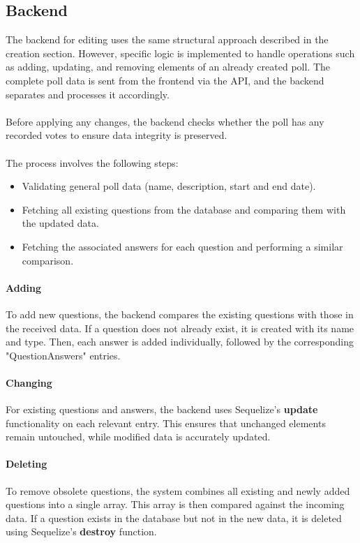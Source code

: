 \documentclass[a4paper,12pt]{report}
\begin{document}
\subsection{Backend}
The backend for editing uses the same structural approach described in the creation section. However, specific logic is implemented to handle operations such as adding, updating, and removing elements of an already created poll. The complete poll data is sent from the frontend via the API, and the backend separates and processes it accordingly. \\ \\
Before applying any changes, the backend checks whether the poll has any recorded votes to ensure data integrity is preserved. \\ \\
The process involves the following steps:
\begin{itemize}
	\item Validating general poll data (name, description, start and end date).
	\item Fetching all existing questions from the database and comparing them with the updated data.
	\item Fetching the associated answers for each question and performing a similar comparison.
\end{itemize}

\paragraph{Adding}
To add new questions, the backend compares the existing questions with those in the received data. If a question does not already exist, it is created with its name and type. Then, each answer is added individually, followed by the corresponding "QuestionAnswers" entries.

\paragraph{Changing}
For existing questions and answers, the backend uses Sequelize's \textbf{update} functionality on each relevant entry. This ensures that unchanged elements remain untouched, while modified data is accurately updated.

\paragraph{Deleting}
To remove obsolete questions, the system combines all existing and newly added questions into a single array. This array is then compared against the incoming data. If a question exists in the database but not in the new data, it is deleted using Sequelize’s \textbf{destroy} function. \\ 
\end{document}
